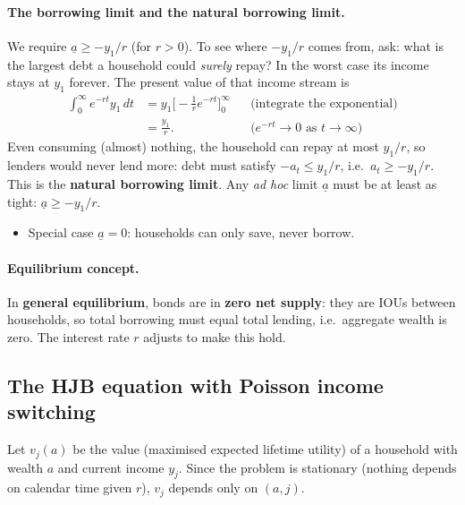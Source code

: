 \paragraph{The borrowing limit and the natural borrowing limit.}
We require $\underline a\ge -y_1/r$ (for $r>0$). To see where $-y_1/r$ comes from, ask: what is the largest debt a household could \emph{surely} repay? In the worst case its income stays at $y_1$ forever. The present value of that income stream is
\begin{align*}
  \int_0^\infty e^{-rt}y_1\,dt
  &= y_1\Big[-\tfrac{1}{r}e^{-rt}\Big]_0^\infty &&\text{(integrate the exponential)}\\
  &= \frac{y_1}{r}. &&\text{(}e^{-rt}\to0\text{ as }t\to\infty\text{)}
\end{align*}
Even consuming (almost) nothing, the household can repay at most $y_1/r$, so lenders would never lend more: debt must satisfy $-a_t\le y_1/r$, i.e.\ $a_t\ge -y_1/r$. This is the \textbf{natural borrowing limit}. Any \emph{ad hoc} limit $\underline a$ must be at least as tight: $\underline a\ge -y_1/r$.
\begin{itemize}
  \item Special case $\underline a=0$: households can only save, never borrow.
\end{itemize}

\paragraph{Equilibrium concept.} In \textbf{general equilibrium}, bonds are in \textbf{zero net supply}: they are IOUs between households, so total borrowing must equal total lending, i.e.\ aggregate wealth is zero. The interest rate $r$ adjusts to make this hold.

\subsection{The HJB equation with Poisson income switching }

Let $v_j(a)$ be the value (maximised expected lifetime utility) of a household with wealth $a$ and current income $y_j$. Since the problem is stationary (nothing depends on calendar time given $r$), $v_j$ depends only on $(a,j)$.

